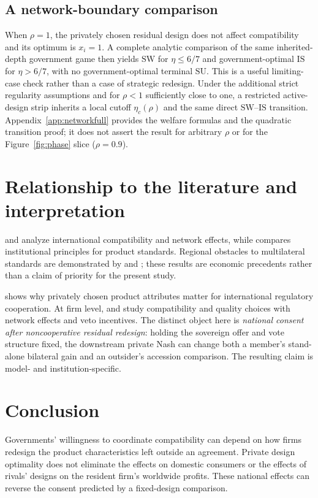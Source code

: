 \documentclass[11pt,a4paper]{article}
\theoremstyle{remark}\newtheorem{remark}[theorem]{Remark}
\newcommand{\SW}{\mathrm{SW}}\newcommand{\SU}{\mathrm{SU}}\newcommand{\IS}{\mathrm{IS}}
\begin{document}
\subsection{A network-boundary comparison}
When $\rho=1$, the privately chosen residual design does not affect compatibility and its optimum is $x_i=1$. A complete analytic comparison of the same inherited-depth government game then yields $\SW$ for $\eta\le6/7$ and government-optimal $\IS$ for $\eta>6/7$, with no government-optimal terminal $\SU$. This is a useful limiting-case check rather than a case of strategic redesign. Under the additional strict regularity assumptions and for $\rho<1$ sufficiently close to one, a restricted active-design strip inherits a local cutoff $\eta_c(\rho)$ and the same direct $\SW$--$\IS$ transition. Appendix~\ref{app:networkfull} provides the welfare formulas and the quadratic transition proof; it does not assert the result for arbitrary $\rho$ or for the Figure~\ref{fig:phase} slice ($\rho=0.9$).

\section{Relationship to the literature and interpretation}\label{sec:literature}
\citet{GandalShy2001} and \citet{Klimenko2009} analyze international compatibility and network effects, while \citet{Costinot2008} compares institutional principles for product standards. Regional obstacles to multilateral standards are demonstrated by \citet{Takarada2020} and \citet{Kawabata2021}; these results are economic precedents rather than a claim of priority for the present study.

\citet{Grossman2021} shows why privately chosen product attributes matter for international regulatory cooperation. At firm level, \citet{Buccella2023} and \citet{Cheng2025} study compatibility and quality choices with network effects and veto incentives. The distinct object here is \emph{national consent after noncooperative residual redesign}: holding the sovereign offer and vote structure fixed, the downstream private Nash can change both a member's stand-alone bilateral gain and an outsider's accession comparison. The resulting claim is model- and institution-specific.

\section{Conclusion}
Governments' willingness to coordinate compatibility can depend on how firms redesign the product characteristics left outside an agreement. Private design optimality does not eliminate the effects on domestic consumers or the effects of rivals' designs on the resident firm's worldwide profits. These national effects can reverse the consent predicted by a fixed-design comparison.
\end{document}
